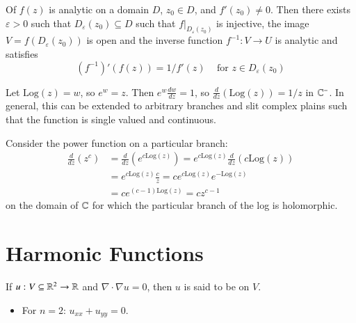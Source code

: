 \documentclass[12pt, a4paper, oneside, openright, titlepage]{book}
\begin{document}
\begin{thm}\label{thm:invfunc}
    Of $f(z)$ is analytic on a domain $D$, $z_0 \in D$, and $f'(z_0) \neq 0$. Then there exists $\varepsilon > 0$ such that $D_{\varepsilon}(z_0) \subseteq D$ such that $f\vert_{D_{\varepsilon}(z_0)}$ is injective, the image $V = f(D_{\varepsilon}(z_0))$ is open and the inverse function $f^{-1}:V\rightarrow U$ is analytic and satisfies \begin{equation*}
        (f^{-1})'(f(z)) = 1/f'(z)\;\;\;\text{ for } z \in D_{\varepsilon}(z_0)
    \end{equation*}
\end{thm}

\begin{eg}
    Let $\text{Log}(z) = w$, so $e^w = z$. Then $e^w\frac{dw}{dz} = 1$, so $\frac{d}{dz}(\text{Log}(z)) = 1/z$ in $\mathbb C^-$. In general, this can be extended to arbitrary branches and slit complex plains such that the function is single valued and continuous.
\end{eg}

\begin{eg}
    Consider the power function on a particular branch: \begin{align*}
        \frac{d}{dz}(z^c) &= \frac{d}{dz}(e^{c\text{Log}(z)}) = e^{c\text{Log}(z)}\frac{d}{dz}({c\text{Log}(z)}) \\
        &= e^{c\text{Log}(z)}\frac{c}{z} = ce^{c\text{Log}(z)}e^{-\text{Log}(z)} \\
        &= ce^{(c-1)\text{Log}(z)} = cz^{c-1}
    \end{align*}
    on the domain of $\mathbb C$ for which the particular branch of the log is holomorphic.
\end{eg}




\section{Harmonic Functions}

\begin{defn}
    If $u:V\subseteq \mathbb R^2\rightarrow \mathbb R$ and $\nabla\cdot \nabla u = 0$, then $u$ is said to be  on $V$. \begin{itemize}
        \item For $n = 2$: $u_{xx} + u_{yy} = 0$.
    \end{itemize}
\end{defn}
\end{document}

